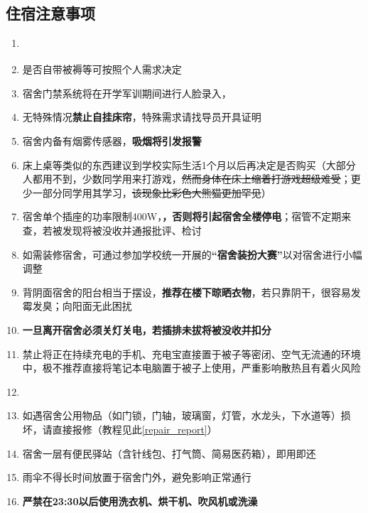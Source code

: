 \subsection[住宿注意事项]{住宿注意事项}
\begin{enumerate}
    \item \textbf{}
          \label{random_allocation}
    \item 是否自带被褥等可按照个人需求决定\footnotemark
    \item 宿舍门禁系统将在开学军训期间进行人脸录入，\textbf{}
    \item 无特殊情况\textbf{禁止自挂床帘}，特殊需求请找导员开具证明
    \item 宿舍内备有烟雾传感器，\textbf{吸烟将引发报警\footnotemark}
    \item 床上桌等类似的东西建议到学校实际生活1个月以后再决定是否购买（大部分人都用不到，少数同学用来打游戏，\sout{然而身体在床上缩着打游戏超级难受}；更少一部分同学用其学习，\sout{该现象\linebreak[3]比彩色大熊猫更加罕见}）
    \item 宿舍单个插座的功率限制400W\footnotemark，\textbf{，否则将引起宿舍全楼停电}；宿管不定期来查，若被发现将被没收并通报批评、检讨
    \item 如需装修宿舍，可通过参加学校统一开展的\textbf{“宿舍装扮大赛”}\footnotemark 以对宿舍进行小幅调整
    \item 背阴面宿舍的阳台相当于摆设，\textbf{推荐在楼下晾晒衣物}，若只靠阴干，很容易发霉发臭；向阳面无此困扰
    \item \textbf{一旦离开宿舍必须关灯关电，若插排未拔将被没收并扣分}
    \item 禁止将正在持续充电的手机、充电宝直接置于被子等密闭、空气无流通的环境中，极不推荐直接将笔记本电脑置于被子上使用，严重影响散热且有着火风险
    \item \textbf{}\footnotemark
    \item 如遇宿舍公用物品（如门锁，门轴，玻璃窗，灯管，水龙头，下水道等）损坏，请直接报修（教程见此\uline{\ref{repair_report}}）
    \item 宿舍一层有便民驿站（含针线包、打气筒、简易医药箱），即用即还
    \item 雨伞不得长时间放置于宿舍门外，避免影响正常通行
    \item \textbf{严禁在23:30以后使用洗衣机、烘干机、吹风机或洗澡}
\end{enumerate}

